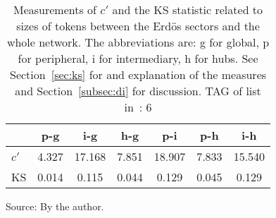 \begin{table}[h!]
\begin{center}
	\caption{Measurements of $c'$ and the KS statistic related to sizes of tokens between the Erd\"os sectors and the whole network. The abbreviations are: g for global, p for peripheral, i for intermediary, h for hubs. See Section~\ref{sec:ks} for and explanation of the measures and Section~\ref{subsec:di} for discussion. TAG of list in~\cite{textTables}: 6}
\label{tab:kolTok}
\begin{tabular}{l || c | c | c | c | c | c}\hline
{\bf } & {\bf p-g} & {\bf i-g} & {\bf h-g} & {\bf p-i} & {\bf p-h} & {\bf i-h} \\\hline\hline
$c'$ & 4.327  & 17.168  & 7.851  & 18.907  & 7.833  & 15.540 \\
KS & 0.014  & 0.115  & 0.044  & 0.129  & 0.045  & 0.129 \\\hline
\end{tabular}
\begin{flushleft}\footnotesize
Source: By the author.\
\end{flushleft}
\end{center}
\end{table}
